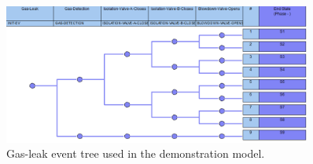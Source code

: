 \begin{figure}[H]
    \centering
    \includegraphics[width=0.9\textwidth]{3_identifying_gaps/benchmarking/datasets/figures/gas_leak_event_tree.png}
    \caption{Gas-leak event tree used in the demonstration model.}
    \label{fig:gas_leak_event_tree}
\end{figure}